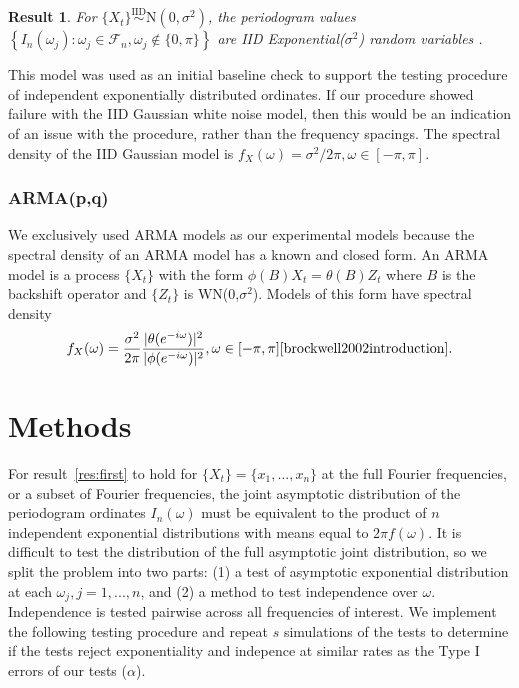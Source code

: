 \documentclass{article}\usepackage[]{graphicx}\usepackage[]{color}
\newcommand{\mj}[1]{{\color{blue} #1}}
\theoremstyle{plain}
\newtheorem{res}{Result}
\begin{document}
\begin{res}
For $\{X_t\} \stackrel{\text{IID}}{\sim} \text{N}(0,\sigma^2)$, the periodogram values $\left\{ I_n(\omega_j): \omega_j \in \mathcal{F}_n, \omega_j \not\in \{0,\pi\} \right\}$ are IID Exponential($\sigma^2$) random variables \cite{brockwell2002introduction}.
\end{res}

This model was used as an initial baseline check to support the testing procedure of independent exponentially distributed ordinates. If our procedure showed failure with the IID Gaussian white noise model, then this would be an indication of an issue with the procedure, rather than the frequency spacings. The spectral density of the IID Gaussian model is $f_X(\omega) = \sigma^2/2\pi, \omega \in [-\pi, \pi]$.

\subsubsection*{ARMA(p,q)}
We exclusively used ARMA models as our experimental models because the spectral density of an ARMA model has a known and closed form. An ARMA model is a process $\{X_t\}$ with the form $\phi(B)X_t = \theta(B)Z_t$ where $B$ is the backshift operator and $\{Z_t\}$ is WN(0,$\sigma^2$). Models of this form have spectral density
\begin{align}
f_X(\omega) = \frac{\sigma^2}{2\pi} \frac{|\theta(e^{-i \omega})|^2}{|\phi(e^{-i \omega})|^2}, \omega \in [-\pi, \pi] \text{\cite{brockwell2002introduction}}.
\end{align}



\section{Methods}


For result~\ref{res:first} to hold for $\{X_t\}=\{x_1,...,x_n\}$ at the full Fourier frequencies, or a subset of Fourier frequencies, the joint asymptotic distribution of the periodogram ordinates $I_n(\omega)$ must be equivalent to the product of $n$ independent exponential distributions with means equal to $2\pi f(\omega)$. It is difficult to test the distribution of the full asymptotic joint distribution, so we split the problem into two parts: (1) a test of asymptotic exponential distribution at each $\omega_j, j=1,...,n$, and (2) a method to test independence over $\omega$. Independence is tested pairwise across all frequencies of interest. We implement the following testing procedure and repeat $s$ simulations of the tests to determine if the tests reject exponentiality and indepence at similar rates as the Type I errors of our tests ($\alpha$).
\end{document}
